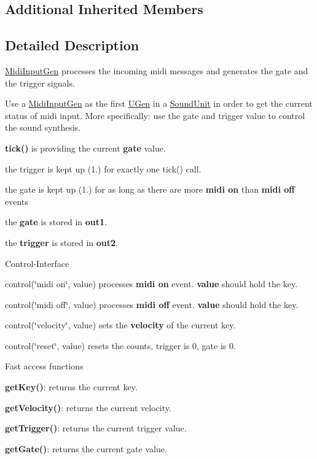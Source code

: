 \subsection*{Additional Inherited Members}


\subsection{Detailed Description}
\hyperlink{classunit_1_1MidiInputGen}{Midi\-Input\-Gen} processes the incoming midi messages and generates the gate and the trigger signals.

Use a \hyperlink{classunit_1_1MidiInputGen}{Midi\-Input\-Gen} as the first \hyperlink{classunit_1_1UGen}{U\-Gen} in a \hyperlink{classunit_1_1SoundUnit}{Sound\-Unit} in order to get the current status of midi input. More specifically\-: use the gate and trigger value to control the sound synthesis.


\begin{DoxyItemize}
\item {\bfseries tick()} is providing the current {\bfseries gate} value.
\item the trigger is kept up (1.) for exactly one tick() call.
\item the gate is kept up (1.) for as long as there are more {\bfseries midi on} than {\bfseries midi off} events
\item the {\bfseries gate} is stored in {\bfseries out1}.
\item the {\bfseries trigger} is stored in {\bfseries out2}.
\end{DoxyItemize}

Control-\/\-Interface


\begin{DoxyItemize}
\item control(\char`\"{}midi on\char`\"{}, value) processes {\bfseries midi on} event. {\bfseries value} should hold the key.
\item control(\char`\"{}midi off\char`\"{}, value) processes {\bfseries midi off} event. {\bfseries value} should hold the key.
\item control(\char`\"{}velocity\char`\"{}, value) sets the {\bfseries velocity} of the current key.
\item control(\char`\"{}reset\char`\"{}, value) resets the counts, trigger is 0, gate is 0.
\end{DoxyItemize}

Fast access functions


\begin{DoxyItemize}
\item {\bfseries get\-Key()}\-: returns the current key.
\item {\bfseries get\-Velocity()}\-: returns the current velocity.
\item {\bfseries get\-Trigger()}\-: returns the current trigger value.
\item {\bfseries get\-Gate()}\-: returns the current gate value.
\end{DoxyItemize}

